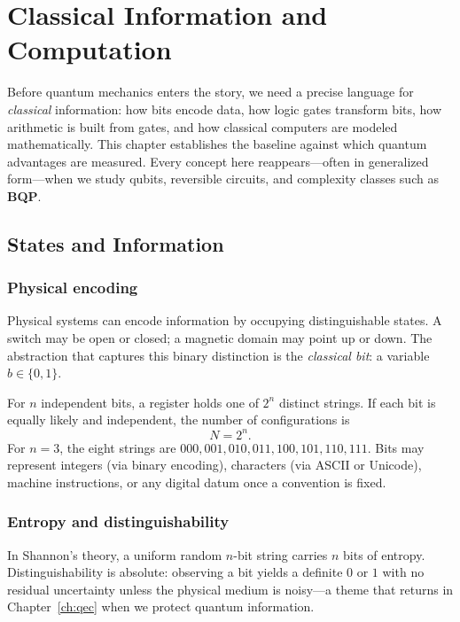 \chapter{Classical Information and Computation}
\label{ch:classical}

Before quantum mechanics enters the story, we need a precise language for \emph{classical} information: how bits encode data, how logic gates transform bits, how arithmetic is built from gates, and how classical computers are modeled mathematically. This chapter establishes the baseline against which quantum advantages are measured. Every concept here reappears---often in generalized form---when we study qubits, reversible circuits, and complexity classes such as \textbf{BQP}.

\section{States and Information}
\label{sec:states-info}

\subsection{Physical encoding}

Physical systems can encode information by occupying distinguishable states. A switch may be open or closed; a magnetic domain may point up or down. The abstraction that captures this binary distinction is the \emph{classical bit}: a variable $b\in\{0,1\}$.

For $n$ independent bits, a register holds one of $2^n$ distinct strings. If each bit is equally likely and independent, the number of configurations is
\begin{equation}
N = 2^n.
\label{eq:2n-states}
\end{equation}
For $n=3$, the eight strings are $000,001,010,011,100,101,110,111$. Bits may represent integers (via binary encoding), characters (via ASCII or Unicode), machine instructions, or any digital datum once a convention is fixed.

\subsection{Entropy and distinguishability}

In Shannon's theory, a uniform random $n$-bit string carries $n$ bits of entropy. Distinguishability is absolute: observing a bit yields a definite $0$ or $1$ with no residual uncertainty unless the physical medium is noisy---a theme that returns in Chapter~\ref{ch:qec} when we protect quantum information.

